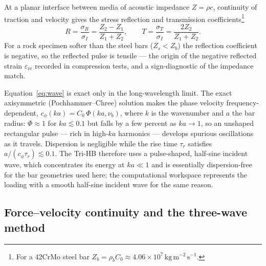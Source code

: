 \documentclass[sn-basic]{sn-jnl}
\newcommand{\Cz}{C_{0}}
\newcommand{\eps}{\varepsilon}
\begin{document}
At a planar interface between media of acoustic impedance $Z=\rho c$, continuity
of traction and velocity gives the stress reflection and transmission
coefficients\footnote{For a 42CrMo steel bar
$Z_b=\rho_b\Cz\approx4.06\times10^{7}\,\mathrm{kg\,m^{-2}\,s^{-1}}$.}
\begin{equation}
R=\frac{\sigma_R}{\sigma_I}=\frac{Z_2-Z_1}{Z_1+Z_2},\qquad
T=\frac{\sigma_T}{\sigma_I}=\frac{2Z_2}{Z_1+Z_2}.
\label{eq:fresnel}
\end{equation}
For a rock specimen softer than the steel bars ($Z_s<Z_b$) the reflection
coefficient is negative, so the reflected pulse is tensile --- the origin of the
negative reflected strain $\eps_{\mathrm{re}}$ recorded in compression tests, and
a sign-diagnostic of the impedance match.

Equation~\eqref{eq:wave} is exact only in the long-wavelength limit. The exact
axisymmetric (Pochhammer--Chree) solution makes the phase velocity
frequency-dependent, $c_\phi(ka)=\Cz\,\Phi(ka,\nu_b)$, where $k$ is the wavenumber
and $a$ the bar radius: $\Phi\approx1$ for $ka\lesssim0.1$ but falls by a few
percent as $ka\to1$, so an unshaped rectangular pulse --- rich in high-$ka$
harmonics --- develops spurious oscillations as it travels. Dispersion is
negligible while the rise time $\tau_r$ satisfies $a/(c_\phi\tau_r)\lesssim0.1$.
The Tri-HB therefore uses a pulse-shaped, half-sine incident wave, which
concentrates its energy at $ka\ll1$ and is essentially dispersion-free for the
bar geometries used here; the computational workspace represents the loading with
a smooth half-sine incident wave for the same reason.

\subsection{Force--velocity continuity and the three-wave method}
\end{document}
